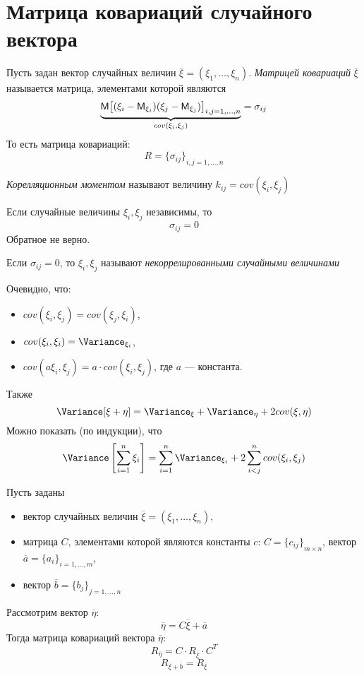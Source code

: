 \section{Матрица ковариаций случайного вектора}
\begin{definition}
  Пусть задан вектор случайных величин $\overline{\xi} = (\xi_1, \ldots, \xi_n)$. \textit{Матрицей ковариаций} $\overline{\xi}$ называется матрица, элементами которой являются
  \[
    \underbrace{\mathsf{M} {\left[ (\xi_i - \mathsf{M}_{\xi_i})(\xi_j - \mathsf{M}_{\xi_j})\right]}_{i, j = 1, \ldots, n}}_{cov(\xi_i, \xi_j)} = \sigma_{ij}
  \]
  То есть матрица ковариаций:
  \[
    R = {\{ \sigma_{ij} \}}_{i, j = 1, \ldots, n}
  \]
\end{definition}
\begin{definition}
  \textit{Корелляционным моментом} называют величину $k_{ij} = cov(\xi_i, \xi_j)$
\end{definition}
Если случайные величины $\xi_i, \xi_j$ независимы, то
\[
  \sigma_{ij} = 0
\]
Обратное не верно. \\
\begin{definition}
  Если $\sigma_{ij} = 0$, то $\xi_i, \xi_j$ называют \textit{некоррелированными случайными величинами}
\end{definition}
Очевидно, что:
\begin{itemize}
  \item $cov(\xi_i, \xi_j) = cov(\xi_j, \xi_i)$,
  \item $cov(\xi_i, \xi_i) = \Variance_{\xi_i}$,
  \item $cov(a\xi_i, \xi_j) = a \cdot cov(\xi_i, \xi_j)$, где $a$ --- константа.
\end{itemize}
Также
\[
  \Variance [\xi + \eta] = \Variance_{\xi} + \Variance_{\eta} + 2cov(\xi, \eta)
\]
Можно показать (по индукции), что
\[
  \Variance \left[ \sum\limits_{i = 1}^n \xi_i \right] = \sum\limits_{i = 1}^n \Variance_{\xi_i} + 2 \sum\limits_{i < j}^n cov(\xi_i, \xi_j)
\]
\begin{theorem}
  Пусть заданы
  \begin{itemize}
    \item вектор случайных величин $\overline{\xi} = (\xi_1, \ldots, \xi_n)$,
    \item матрица $C$, элементами которой являются константы $c$: $C = {\{ c_{ij}\}}_{m \times n}$, вектор $\overline{a} = {\{ a_i \}}_{i = 1, \ldots, m}$,
    \item вектор $\overline{b} = {\{ b_j \}}_{j = 1, \ldots, n}$
  \end{itemize}
  Рассмотрим вектор $\overline{\eta}$:
  \[
    \overline{\eta} = C \overline{\xi} + \overline{a}
  \]
  Тогда матрица ковариаций вектора $\overline{\eta}$:
  \[
    R_{\overline{\eta}} = C \cdot R_{\overline{\xi}} \cdot C^T
  \]
  \[
    R_{\overline{\xi} + \overline{b}} = R_{\overline{\xi}}
  \]
\end{theorem}
